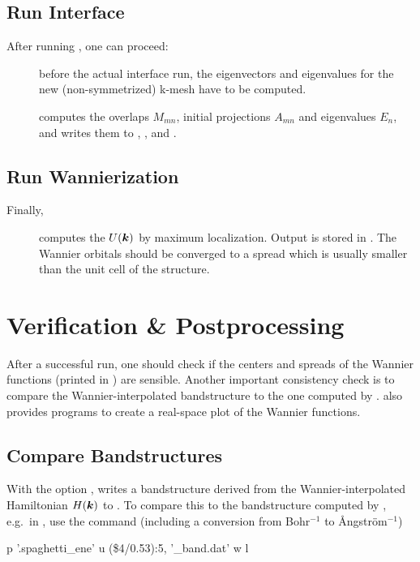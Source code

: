 \subsection{Run Interface}
After running \initwiiw, one can proceed:
\begin{description}
\item[] before the actual interface run, the
  eigenvectors and eigenvalues for the new (non-symmetrized) k-mesh
  have to be computed.
\item[] computes the overlaps $M_{mn}$, initial
  projections $A_{mn}$ and eigenvalues $E_n$, and writes them to
  , , and .
\end{description}


\subsection{Run Wannierization}
Finally,
\begin{description}
\item[] computes the $U(\boldsymbol k)$ by maximum
  localization.  Output is stored in . The Wannier
  orbitals should be converged to a spread which is usually smaller
  than the unit cell of the structure.
 \end{description}


\section{Verification \& Postprocessing}
\label{sec:quickstart_post}

After a successful \wannier run, one should check if the centers and
spreads of the Wannier functions (printed in ) are
sensible.  Another important consistency check is to compare the
Wannier-interpolated bandstructure to the one computed by \wien.
\Wtow also provides programs to create a real-space plot of the
Wannier functions.

\subsection{Compare Bandstructures}
With the option , \wannier writes a bandstructure
derived from the Wannier-inter\-po\-la\-ted Hamiltonian $H(\boldsymbol k)$ to
.  To compare this to the bandstructure
computed by , e.g.\ in , use the command
(including a conversion from Bohr$^{-1}$ to \AA{}ng\-str\"om$^{-1}$)
\begin{usage}
  p '\case.spaghetti\_ene' u (\$4/0.53):5, '\case{}\_band.dat' w l
\end{usage}

